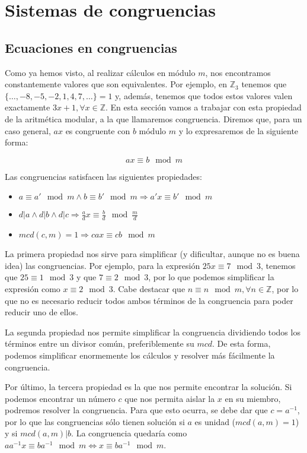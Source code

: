 \section{Sistemas de congruencias}\label{sistemas-de-congruencias}

\subsection{Ecuaciones en congruencias}

Como ya hemos visto, al realizar cálculos en módulo $m$, nos encontramos constantemente valores que son equivalentes.
Por ejemplo, en $\mathbb{Z}_3$ tenemos que $\{\ldots, -8, -5 ,-2, 1, 4, 7, \ldots\} = 1$ y, además, tenemos que todos estos valores valen exactamente $3x + 1, \forall x \in\mathbb{Z}$.
En esta sección vamos a trabajar con esta propiedad de la aritmética modular, a la que llamaremos congruencia.
Diremos que, para un caso general, $ax$ es congruente con $b$ módulo $m$ y lo expresaremos de la siguiente forma:

\[ax \equiv b \mod m\]

Las congruencias satisfacen las siguientes propiedades:

\begin{itemize}
	\item $a \equiv a' \mod m \land b \equiv b' \mod m \Rightarrow a'x \equiv b' \mod m$
	\item $d|a \land d|b \land d|c \Rightarrow \frac{a}{d}x \equiv \frac{b}{d} \mod \frac{m}{d}$
	\item $mcd(c,m) = 1 \Rightarrow cax \equiv cb \mod m$
\end{itemize}

La primera propiedad nos sirve para simplificar (y dificultar, aunque no es buena idea) las congruencias.
Por ejemplo, para la expresión $25x \equiv 7 \mod 3$, tenemos que $25 \equiv 1 \mod 3$ y que $7 \equiv 2 \mod 3$, por lo que podemos simplificar la expresión como $x \equiv 2 \mod 3$.
Cabe destacar que $n \equiv n \mod m, \forall n \in\mathbb{Z}$, por lo que no es necesario reducir todos ambos términos de la congruencia para poder reducir uno de ellos.

La segunda propiedad nos permite simplificar la congruencia dividiendo todos los términos entre un divisor común, preferiblemente su $mcd$.
De esta forma, podemos simplificar enormemente los cálculos y resolver más fácilmente la congruencia.

Por último, la tercera propiedad es la que nos permite encontrar la solución.
Si podemos encontrar un número $c$ que nos permita aislar la $x$ en su miembro, podremos resolver la congruencia.
Para que esto ocurra, se debe dar que $c=a^{-1}$, por lo que las congruencias sólo tienen solución si $a$ es unidad ($mcd(a,m)=1$) y si $mcd(a,m)|b$.
La congruencia quedaría como $aa^{-1}x \equiv ba^{-1} \mod m \Leftrightarrow x \equiv ba^{-1} \mod m$.

